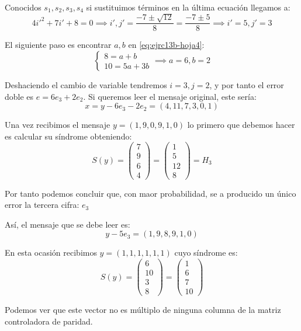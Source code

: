 \begin{problem}[13]
Conocidos $s_1,s_2,s_3,s_4$ si sustituimos términos en la última ecuación llegamos a:
\[4i'^2 + 7i' + 8 = 0 \implies i',j'= \frac{-7\pm \sqrt{12}}{8} = \frac{-7 \pm 5}{8} \implies i'=5, j'=3\]

El siguiente paso es encontrar $a,b$ en \ref{eq:ejrc13b-hoja4}:
\[
	\left\{ \begin{array}{l}
		8 = a+b\\
		10 = 5a + 3b
	\end{array}\right.
	\implies a=6,b=2
\]

Deshaciendo el cambio de variable tendremos $i=3,j=2$, y por tanto el error doble es $e=6e_3+2e_2$. Si queremos leer el mensaje original, este sería:
\[x = y - 6e_3 - 2e_2 = (4,11,7,3,0,1)\]

\spart


Una vez recibimos el mensaje $y=(1,9,0,9,1,0)$ lo primero que debemos hacer es calcular su síndrome obteniendo:
\[S(y) = \left( \begin{array}{c} 7 \\ 9 \\ 6 \\ 4\end{array}\right) = \left( \begin{array}{c} 1 \\ 5 \\ 12 \\ 8\end{array}\right) = H_3\]

Por tanto podemos concluir que, con maor probabilidad, se a producido un único error la tercera cifra: $e_3$

Así, el mensaje que se debe leer es:
\[y-5e_3 = (1,9,8,9,1,0)\]

\spart


En esta ocasión recibimos $y=(1,1,1,1,1,1)$ cuyo síndrome es:
\[S(y)=\left( \begin{array}{c} 6 \\ 10\\ 3 \\8\end{array}\right)=\left( \begin{array}{c} 1 \\ 6 \\ 7 \\ 10\end{array}\right)\]

Podemos ver que este vector no es múltiplo de ninguna columna de la matriz controladora de paridad.


\end{problem}
